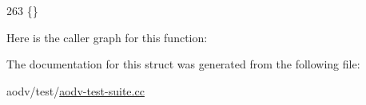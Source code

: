 \begin{DoxyCode}
263 \{\}
\end{DoxyCode}


Here is the caller graph for this function\+:




The documentation for this struct was generated from the following file\+:\begin{DoxyCompactItemize}
\item 
aodv/test/\hyperlink{aodv-test-suite_8cc}{aodv-\/test-\/suite.\+cc}\end{DoxyCompactItemize}
